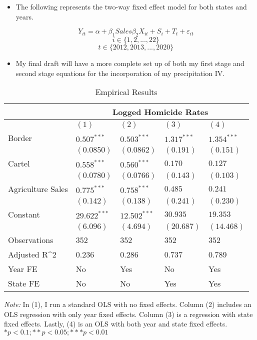 \documentclass[12pt]{article}
\begin{document}
\begin{itemize}
    \item The following represents the two-way fixed effect model for both states and years.  
    
    $$Y_{it}=\alpha+\beta_1Sales\beta_2 X_{it}+S_i+T_t+\varepsilon_{it}$$
$$i\in \{1,2,...,22\}$$
$$t \in \{2012, 2013,...,2020\}$$

\item My final draft will have a more complete set up of both my first stage and second stage equations for the incorporation of my precipitation IV.
    
    
\end{itemize}


\FloatBarrier
\begin{table}[h]
  \begin{threeparttable}
 
  \caption{Empirical Results}\centering
  \small
\begin{tabular}{lllll}
\hline \hline 
\cline { 2 - 7 } & \multicolumn{4}{c}{Logged Homicide Rates} \\
\hline & $(1)$ & $(2)$ & $(3)$ & $(4)$ \\
\hline Border & $0.507^{***}$ & $0.503^{***}$ & $1.317^{***}$ & $1.354^{***}$  \\
& $(0.0850)$ & $(0.0862)$ & $(0.191)$ & $(0.151)$  \\
Cartel & $0.558^{***}$ & $0.560^{***}$ & $0.170$ & $0.127$  \\
& $(0.0780)$ & $(0.0766)$ & $(0.143)$ & $(0.103)$  \\
Agriculture Sales & $0.775^{***}$ & $0.758^{***}$ & $0.485$ & $0.241$ \\
& $(0.142)$ & $(0.138)$ & $(0.241)$ & $(0.230)$ \\


Constant & $29.622^{* * *}$ & $12.502^{* * *}$ & $30.935$ & $19.353$ \\
& $(6.096)$ & $(4.694)$ & $(20.687)$ & $(14.468)$ \\

\hline Observations & 352 & 352 & 352&352 \\
Adjusted R^2 & 0.236 & 0.286 & 0.737 & 0.789  \\
Year FE & No & Yes & No & Yes  \\
State FE & No & No & Yes & Yes  \\
\hline \hline
\end{tabular}
   \begin{tablenotes}\left
      \scriptsize
      
\textit{Note:} In (1), I run a standard OLS with no fixed effects. Column (2) includes an OLS regression with only year fixed effects. Column (3) is a regression with state fixed effects. Lastly, (4) is an OLS with both year and state fixed effects.    $* p<0.1 ; * * p<0.05 ; * * * p<0.01$
    \end{tablenotes}
  \end{threeparttable}
\end{table}
\FloatBarrier
\end{document}
